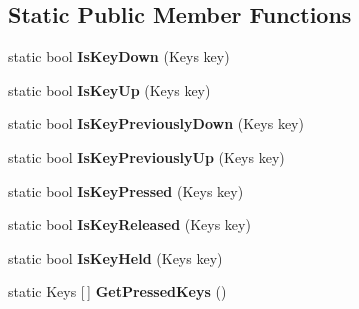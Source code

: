 \subsection*{Static Public Member Functions}
\begin{DoxyCompactItemize}
\item 
\mbox{\label{class_n_g_sim_1_1_input_1_1_input_manager_af8b3f60a2719a435cd3d793a3d4ce661}} 
static bool {\bfseries Is\+Key\+Down} (Keys key)
\item 
\mbox{\label{class_n_g_sim_1_1_input_1_1_input_manager_ad2c9499d86a1fa7b72ef256771ea66b7}} 
static bool {\bfseries Is\+Key\+Up} (Keys key)
\item 
\mbox{\label{class_n_g_sim_1_1_input_1_1_input_manager_a28a987bd95bb352405d0ceadc3adc549}} 
static bool {\bfseries Is\+Key\+Previously\+Down} (Keys key)
\item 
\mbox{\label{class_n_g_sim_1_1_input_1_1_input_manager_a0598eb631e1ad3d29e61557947b8f61c}} 
static bool {\bfseries Is\+Key\+Previously\+Up} (Keys key)
\item 
\mbox{\label{class_n_g_sim_1_1_input_1_1_input_manager_a48c984c77fe697f51dd871fc68cebab7}} 
static bool {\bfseries Is\+Key\+Pressed} (Keys key)
\item 
\mbox{\label{class_n_g_sim_1_1_input_1_1_input_manager_aae3623eb47a24ef02a9edb58fd40535c}} 
static bool {\bfseries Is\+Key\+Released} (Keys key)
\item 
\mbox{\label{class_n_g_sim_1_1_input_1_1_input_manager_a6e7a0a10ceab6364269b600a3a84c980}} 
static bool {\bfseries Is\+Key\+Held} (Keys key)
\item 
\mbox{\label{class_n_g_sim_1_1_input_1_1_input_manager_a27995fcca10de7187012bdb5e0e1e94e}} 
static Keys \mbox{[}$\,$\mbox{]} {\bfseries Get\+Pressed\+Keys} ()
\item 
\mbox{\label{class_n_g_sim_1_1_input_1_1_input_manager_ace3734244fdb687d422195944b67f0a3}} 

\end{DoxyCompactItemize}
